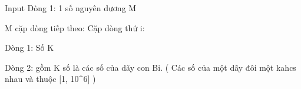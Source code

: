 Input
Dòng 1: 1 số nguyên dương M

M cặp dòng tiếp theo: Cặp dòng thứ i:


Dòng 1: Số K


Dòng 2: gồm K số là các số của dãy con Bi. ( Các số của một dãy đôi một kahcs nhau và thuộc [1, 10^6] )